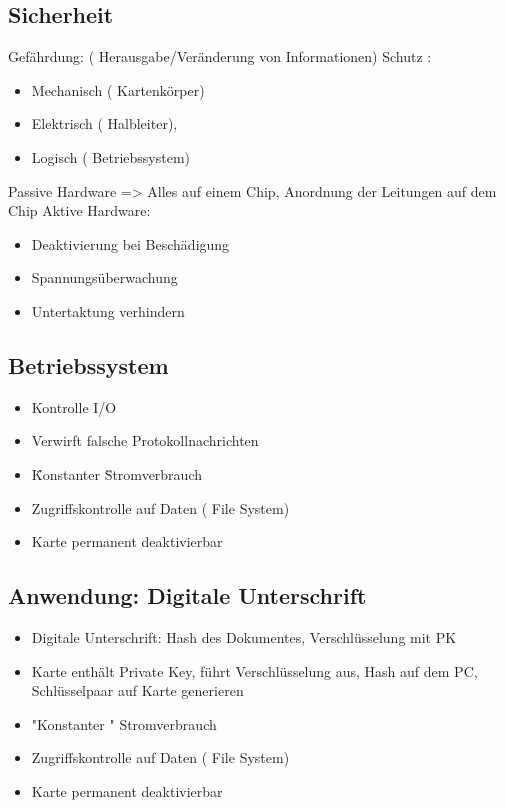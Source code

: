 \subsection*{  Sicherheit }
Gefährdung: ( Herausgabe/Veränderung von Informationen) 
Schutz :
	\begin{itemize}
	\item Mechanisch ( Kartenkörper)
	\item  Elektrisch ( Halbleiter), 
	\item Logisch ( Betriebssystem)
\end{itemize}
	Passive Hardware => Alles auf einem Chip, Anordnung der Leitungen auf dem Chip
	Aktive Hardware:
	\begin{itemize}
	\item Deaktivierung bei Beschädigung
	\item Spannungsüberwachung
	\item Untertaktung verhindern
\end{itemize}

\subsection*{  Betriebssystem }
\begin{itemize}
	\item Kontrolle I/O
	\item Verwirft falsche Protokollnachrichten
	\item \"Konstanter \" Stromverbrauch
	\item Zugriffskontrolle auf Daten ( File System)
	\item Karte permanent deaktivierbar 
\end{itemize}

\subsection*{  Anwendung: Digitale Unterschrift }
\begin{itemize}
	\item Digitale Unterschrift: Hash des Dokumentes, Verschlüsselung mit PK
	\item Karte enthält Private Key, führt Verschlüsselung aus, Hash auf dem PC, Schlüsselpaar auf Karte generieren
	\item "Konstanter " Stromverbrauch
	\item Zugriffskontrolle auf Daten ( File System)
	\item Karte permanent deaktivierbar 
\end{itemize}

